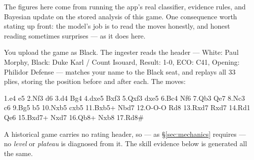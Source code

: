 \documentclass[11pt]{article}
\newcommand{\code}[1]{{\ttfamily #1}}
\begin{document}
\begin{notebox}
The figures here come from running the app's real classifier, evidence rules,
and Bayesian update on the stored analysis of this game. One consequence worth
stating up front: the model's job is to read the moves honestly, and honest
reading sometimes surprises --- as it does here.
\end{notebox}

\begin{playbox}
You upload the game as Black. The ingester reads the header ---
\code{White: Paul Morphy}, \code{Black: Duke Karl / Count Isouard},
\code{Result: 1-0}, \code{ECO: C41}, \code{Opening: Philidor Defense} --- matches
your name to the Black seat, and replays all 33 plies, storing the position
before and after each. The moves:

\vspace{4pt}
{\ttfamily\small 1.e4 e5 2.Nf3 d6 3.d4 Bg4 4.dxe5 Bxf3 5.Qxf3 dxe5 6.Bc4 Nf6
7.Qb3 Qe7 8.Nc3 c6 9.Bg5 b5 10.Nxb5 cxb5 11.Bxb5+ Nbd7 12.O-O-O Rd8 13.Rxd7
Rxd7 14.Rd1 Qe6 15.Bxd7+ Nxd7 16.Qb8+ Nxb8 17.Rd8\#}

\vspace{4pt}
\footnotesize\color{slate}
A historical game carries no rating header, so --- as \S\ref{sec:mechanics}
requires --- no \emph{level} or \emph{plateau} is diagnosed from it. The skill
evidence below is generated all the same.
\end{playbox}
\end{document}
